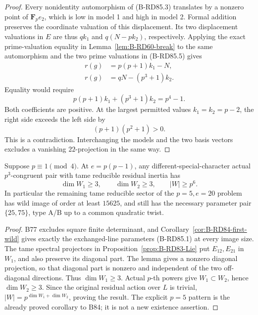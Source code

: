 \begin{proof}
Every nonidentity automorphism of (B-RD85.3) translates
by a nonzero point of \(\mathbf F_pe_2\), which is low
in model 1 and high in model 2. Formal addition preserves
the coordinate valuation of this displacement. Its two
displacement valuations in \(E\) are thus \(qk_1\) and
\(q(N-pk_2)\), respectively. Applying the exact
prime-valuation equality in
Lemma~\ref{lem:B-RD60-break} to the same automorphism
and the two prime valuations in (B-RD85.5) gives
\[
 \begin{split}
  r(g)&=p(p+1)k_1-N,\\
  r(g)&=qN-(p^3+1)k_2.
 \end{split}                                         \tag{B-RD85.6}
\]
Equality would require
\[
         p(p+1)k_1+(p^3+1)k_2=p^4-1.                \tag{B-RD85.7}
\]
Both coefficients are positive. At the largest permitted
values \(k_1=k_2=p-2\), the right side exceeds the left
side by
\[
                     (p+1)(p^2+1)>0.                \tag{B-RD85.8}
\]
This is a contradiction. Interchanging the models and
the two basis vectors excludes a vanishing
\(22\)-projection in the same way.
\end{proof}

\begin{corollary}
\label{cor:B-RD85-tame}
Suppose \(p\equiv1\pmod4\). At \(e=p(p-1)\), any
different-special-character actual \(p^3\)-congruent
pair with tame reducible residual inertia has
\[
                \dim W_1\ge3,\qquad\dim W_2\ge3,
                        \qquad |W|\ge p^6.          \tag{B-RD85.9}
\]
In particular the remaining tame reducible sector of
the \(p=5,e=20\) problem has wild image of order at
least \(15625\), and still has the necessary parameter
pair \(\{25,75\}\), type A/B up to a common quadratic
twist.
\end{corollary}
\begin{proof}
B77 excludes square finite determinant, and
Corollary~\ref{cor:B-RD84-first-wild} gives exactly the
exchanged-line parameters (B-RD85.1) at every image size.
The tame spectral projectors in
Proposition~\ref{prop:B-RD83-Lie} put
\(E_{12},E_{21}\) in \(W_1\), and also preserve its
diagonal part. The lemma gives a nonzero diagonal
projection, so that diagonal part is nonzero and
independent of the two off-diagonal directions.
Thus \(\dim W_1\ge3\). Actual \(p\)-th powers give
\(W_1\subset W_2\), hence \(\dim W_2\ge3\).
Since the original residual action over \(L\) is trivial,
\(|W|=p^{\dim W_1+\dim W_2}\), proving the result.
The explicit \(p=5\) pattern is the already proved
corollary to B84; it is not a new existence assertion.
\end{proof}

